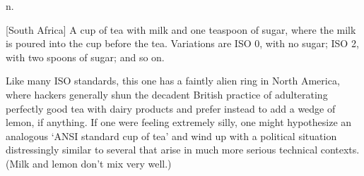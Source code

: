  n.

[South Africa] A cup of tea with milk and one teaspoon of sugar, where the milk is poured into the cup before the tea. Variations are ISO 0,
with no sugar; ISO 2, with two spoons of sugar; and so on.

Like many ISO standards, this one has a faintly alien ring in North America, where hackers generally shun the decadent British practice of
adulterating perfectly good tea with dairy products and prefer instead to add a wedge of lemon, if anything. If one were feeling extremely
silly, one might hypothesize an analogous `ANSI standard cup of tea' and wind up with a political situation distressingly similar to several
that arise in much more serious technical contexts. (Milk and lemon don't mix very well.)

